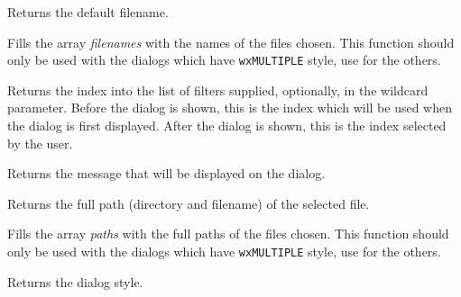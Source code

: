 
Returns the default filename.

\label{wxfiledialoggetfilenames}


Fills the array {\it filenames} with the names of the files chosen. This
function should only be used with the dialogs which have {\tt wxMULTIPLE} style,
use  for the others.

\label{wxfiledialoggetfilterindex}


Returns the index into the list of filters supplied, optionally, in the wildcard parameter.
Before the dialog is shown, this is the index which will be used when the dialog is first displayed.
After the dialog is shown, this is the index selected by the user.

\label{wxfiledialoggetmessage}


Returns the message that will be displayed on the dialog.

\label{wxfiledialoggetpath}


Returns the full path (directory and filename) of the selected file.

\label{wxfiledialoggetpaths}


Fills the array {\it paths} with the full paths of the files chosen. This
function should only be used with the dialogs which have {\tt wxMULTIPLE} style,
use  for the others.

\label{wxfiledialoggetstyle}


Returns the dialog style.

\label{wxfiledialoggetwildcard}


